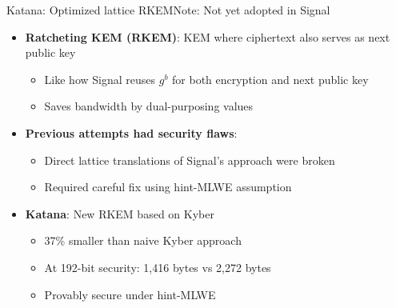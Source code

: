 \documentclass[aspectratio=169, lualatex, handout]{beamer}
\begin{document}
\begin{frame}{Katana: Optimized lattice RKEM}{Note: Not yet adopted in Signal}
	\begin{itemize}
		\item \textbf{Ratcheting KEM (RKEM)}: KEM where ciphertext also serves as next public key
		      \begin{itemize}
			      \item Like how Signal reuses $g^b$ for both encryption and next public key
			      \item Saves bandwidth by dual-purposing values
		      \end{itemize}
		\item \textbf{Previous attempts had security flaws}:
		      \begin{itemize}
			      \item Direct lattice translations of Signal's approach were broken
			      \item Required careful fix using hint-MLWE assumption
		      \end{itemize}
		\item \textbf{Katana}: New RKEM based on Kyber
		      \begin{itemize}
			      \item 37\% smaller than naive Kyber approach
			      \item At 192-bit security: 1,416 bytes vs 2,272 bytes
			      \item Provably secure under hint-MLWE
		      \end{itemize}
	\end{itemize}
\end{frame}
\end{document}
